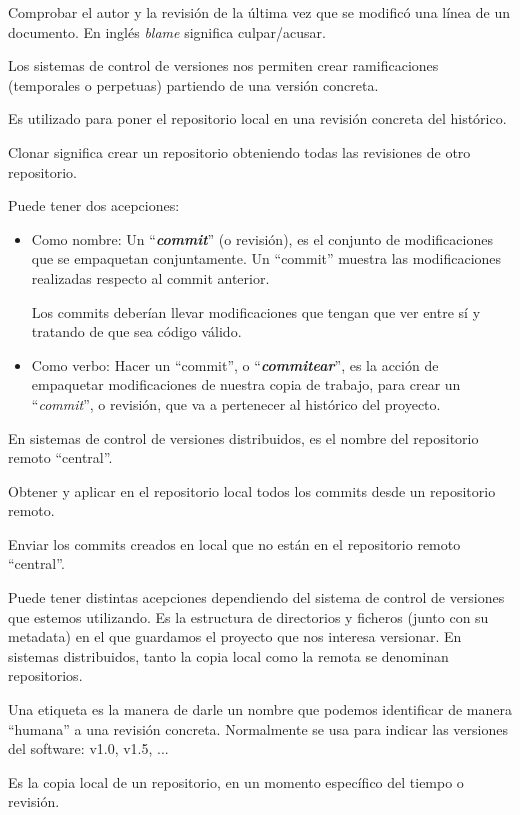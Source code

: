 \begin{description}[style=nextline]
    \item[Blame] Comprobar el autor y la revisión de la última vez que se modificó una línea de un documento. En inglés \textit{blame} significa culpar/acusar.
    \item[Branch] Los sistemas de control de versiones nos permiten crear ramificaciones (temporales o perpetuas) partiendo de una versión concreta.
    \item[Checkout] Es utilizado para poner el repositorio local en una revisión concreta del histórico.
    \item[Clone] Clonar significa crear un repositorio obteniendo todas las revisiones de otro repositorio.
    \item[Commit] Puede tener dos acepciones:
    \begin{itemize}
        \item Como nombre: Un “\textbf{\textit{commit}}” (o revisión), es el conjunto de modificaciones que se empaquetan conjuntamente. Un “commit” muestra las modificaciones realizadas respecto al commit anterior.

        Los commits deberían llevar modificaciones que tengan que ver entre sí y tratando de que sea código válido.
        \item Como verbo: Hacer un “commit”, o “\textit{\textbf{commitear}}”, es la acción de empaquetar modificaciones de nuestra copia de trabajo, para crear un “\textit{commit}”, o revisión, que va a pertenecer al histórico del proyecto.
    \end{itemize}
    \item[Origin] En sistemas de control de versiones distribuidos, es el nombre del repositorio remoto “central”.
    \item[Pull] Obtener y aplicar en el repositorio local todos los commits desde un repositorio remoto.
    \item[Push] Enviar los commits creados en local que no están en el repositorio remoto “central”.
    \item[Repository] Puede tener distintas acepciones dependiendo del sistema de control de versiones que estemos utilizando. Es la estructura de directorios y ficheros (junto con su metadata) en el que guardamos el proyecto que nos interesa versionar. En sistemas distribuidos, tanto la copia local como la remota se denominan repositorios.
    \item[Tag] Una etiqueta es la manera de darle un nombre que podemos identificar de manera “humana” a una revisión concreta. Normalmente se usa para indicar las versiones del software: v1.0, v1.5, ...
    \item[Working copy] Es la copia local de un repositorio, en un momento específico del tiempo o revisión.
\end{description}